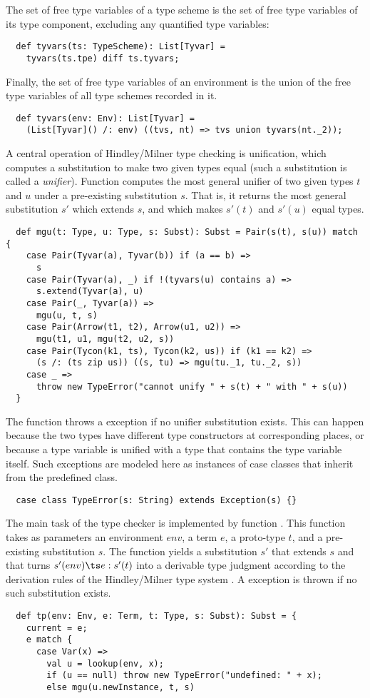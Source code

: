 \documentclass[a4paper,12pt,twoside,titlepage]{book}
\begin{document}
{The set of free type variables of a type scheme is the set of free
type variables of its type component, excluding any quantified type variables:
\begin{lstlisting}
  def tyvars(ts: TypeScheme): List[Tyvar] = 
    tyvars(ts.tpe) diff ts.tyvars;
\end{lstlisting}
Finally, the set of free type variables of an environment is the union
of the free type variables of all type schemes recorded in it.
\begin{lstlisting}
  def tyvars(env: Env): List[Tyvar] =
    (List[Tyvar]() /: env) ((tvs, nt) => tvs union tyvars(nt._2));
\end{lstlisting}
A central operation of Hindley/Milner type checking is unification,
which computes a substitution to make two given types equal (such a
substitution is called a {\em unifier}).  Function  computes
the most general unifier of two given types $t$ and $u$ under a
pre-existing substitution $s$.  That is, it returns the most general
substitution $s'$ which extends $s$, and which makes $s'(t)$ and
$s'(u)$ equal types. 
\begin{lstlisting}
  def mgu(t: Type, u: Type, s: Subst): Subst = Pair(s(t), s(u)) match {
    case Pair(Tyvar(a), Tyvar(b)) if (a == b) => 
      s
    case Pair(Tyvar(a), _) if !(tyvars(u) contains a) =>
      s.extend(Tyvar(a), u)
    case Pair(_, Tyvar(a)) =>
      mgu(u, t, s)
    case Pair(Arrow(t1, t2), Arrow(u1, u2)) =>
      mgu(t1, u1, mgu(t2, u2, s))
    case Pair(Tycon(k1, ts), Tycon(k2, us)) if (k1 == k2) =>
      (s /: (ts zip us)) ((s, tu) => mgu(tu._1, tu._2, s))
    case _ => 
      throw new TypeError("cannot unify " + s(t) + " with " + s(u))
  }
\end{lstlisting}
The  function throws a  exception if no
unifier substitution exists. This can happen because the two types
have different type constructors at corresponding places, or because a
type variable is unified with a type that contains the type variable
itself. Such exceptions are modeled here as instances of case classes
that inherit from the predefined  class.
\begin{lstlisting}
  case class TypeError(s: String) extends Exception(s) {}
\end{lstlisting}
The main task of the type checker is implemented by function
. This function takes as parameters an environment $env$, a
term $e$, a proto-type $t$, and a
pre-existing substitution $s$.  The function yields a substitution
$s'$ that extends $s$ and that
turns $s'(env) \ts e: s'(t)$ into a derivable type judgment according
to the derivation rules of the Hindley/Milner type system \cite{hindley-milner}.  A
 exception is thrown if no such substitution exists.
\begin{lstlisting}
  def tp(env: Env, e: Term, t: Type, s: Subst): Subst = {
    current = e;
    e match {
      case Var(x) =>
        val u = lookup(env, x);
        if (u == null) throw new TypeError("undefined: " + x);
        else mgu(u.newInstance, t, s)


\end{lstlisting}}
\end{document}
